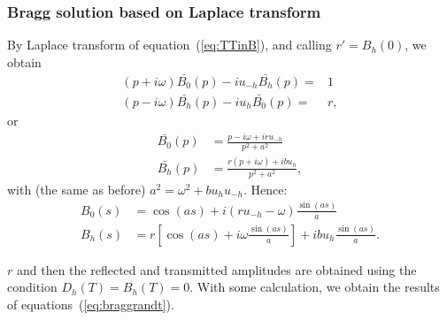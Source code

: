 \documentclass{iucr}
\begin{document}
\subsubsection{Bragg solution based on Laplace transform}By Laplace transform of equation~(\ref{eq:TTinB}), and calling $r'=B_h(0)$, we obtain
\begin{subequations}
\label{eq:TTbraggLaplace}
\begin{align}
(p + i \omega) \bar{B_0}(p) - i u_{-h} \bar{B_h}(p)= & 1 \nonumber \\
(p - i \omega) \bar{B_h}(p) - i u_{h} \bar{B_0}(p)= & r, \nonumber
\end{align}
\end{subequations}
or 
\begin{subequations}
\begin{align}
\bar{B_0}(p) &= \frac{p - i \omega + i r u_{-h}}{p^2 + a^2} \nonumber \\
\bar{B_h}(p) &= \frac{r (p + i \omega) + i b u_h}{p^2 + a^2}, \nonumber
\end{align}
\end{subequations}
with (the same as before) $a^2=\omega^2+b u_h u_{-h}$. Hence:
\begin{subequations}
\begin{align}
B_0(s) &= \cos(a s) + i (r u_{-h} - \omega) \frac{\sin(a s)}{a} \nonumber \\
B_h(s) &= r [\cos(a s) + i \omega \frac{\sin(a s)}{a}] + i b u_h \frac{\sin(a s)}{a}. \nonumber
\end{align}
\end{subequations}

$r$ and then the reflected and transmitted amplitudes are obtained using the condition $D_h(T)=B_h(T)=0$. With some calculation, we obtain the results of equations~(\ref{eq:braggrandt}). 

\end{document}
